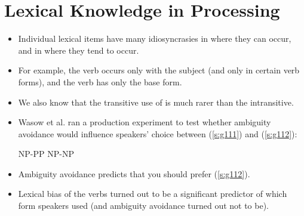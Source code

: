 \documentclass[a4paper,landscape,headrule,footrule]{foils}
\begin{document}
\section{Lexical Knowledge in Processing}


\begin{itemize}
\item Individual lexical items have many idiosyncrasies in 
where they can occur, and in where they tend to 
occur.  
\item For example, the verb  occurs only with the 
subject  (and only in certain verb forms), and the 
verb  has only the base form.
\item We also know that the transitive use of  is much 
rarer than the intransitive. 
\end{itemize}

\begin{center}
  \begin{bchart}[max=100,step=25,unit=\%,scale=2.2]
     
     
     
     
  \end{bchart}
\end{center}

\begin{itemize}
\item Wasow et al. ran a production experiment to test 
whether ambiguity avoidance would influence 
speakers’ choice between (\ref{s:g111}) and (\ref{s:g112}): 
\begin{exe}
\ex \label{s:g111}  \hfill NP-PP
\ex \label{s:g112}  \hfill NP-NP
\end{exe}
\item Ambiguity avoidance predicts that you should prefer (\ref{s:g112}).
\item Lexical bias of the verbs turned out to be a significant 
predictor of which form speakers used (and ambiguity 
avoidance turned out not to be).
\end{itemize}
\end{document}
